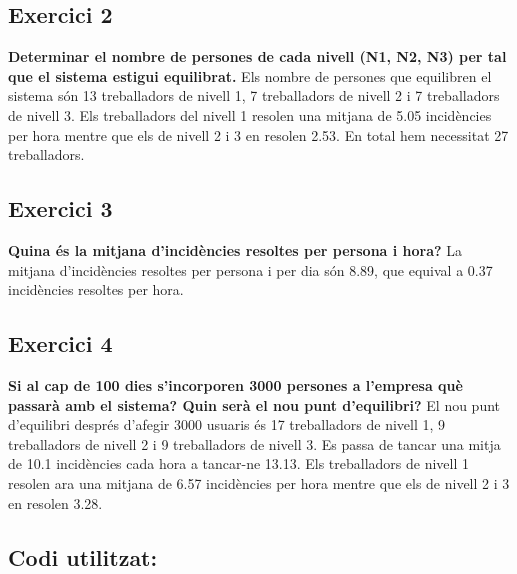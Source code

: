 \documentclass[8pt]{beamer}
\begin{document}
\subsection{Exercici 2}
\begin{frame}
\textbf{Determinar el nombre de persones de cada nivell (N1, N2, N3) per tal que el sistema
estigui equilibrat.}
\newline
\newline
Els nombre de persones que equilibren el sistema són 13 treballadors de nivell 1, 7 treballadors de nivell 2 i 7 treballadors de nivell 3.
\newline Els treballadors del nivell 1 resolen una mitjana de 5.05 incidències per hora mentre que els de nivell 2 i 3 en resolen 2.53.
En total hem necessitat 27 treballadors.
\end{frame}


\subsection{Exercici 3}
\begin{frame}
\textbf{Quina és la mitjana d’incidències resoltes per persona i hora?}
\newline
\newline
La mitjana d'incidències resoltes per persona i per dia són 8.89, que equival a 0.37 incidències resoltes per hora.
\end{frame}

\subsection{Exercici 4}
\begin{frame}
\textbf{Si al cap de 100 dies s’incorporen 3000 persones a l’empresa què passarà amb el sistema?
Quin serà el nou punt d’equilibri?}
\newline
\newline
El nou punt d'equilibri després d'afegir 3000 usuaris és 17 treballadors de nivell 1, 9 treballadors de nivell 2 i 9 treballadors de nivell 3.
\newline Es passa de tancar una mitja de 10.1 incidències cada hora a tancar-ne 13.13.  
\newline Els treballadors de nivell 1 resolen ara una mitjana de 6.57 incidències per hora mentre que els de nivell 2 i 3 en resolen 3.28.
\subsection{Codi utilitzat:}

\end{frame}
\end{document}
